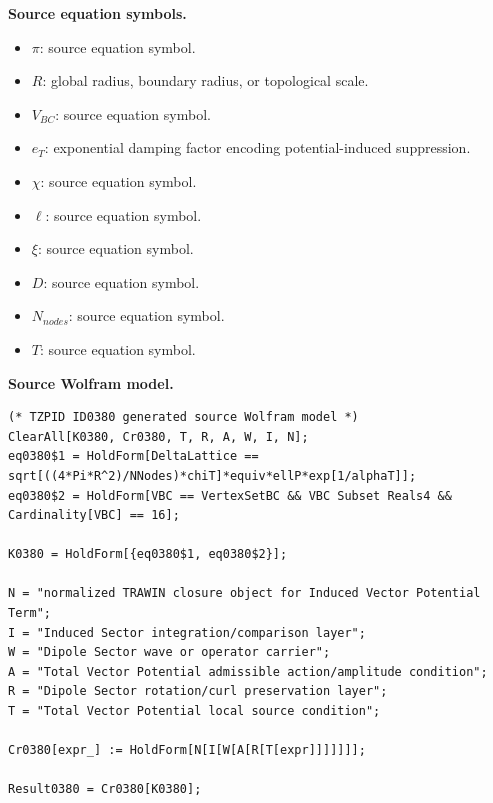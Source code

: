 \begin{minipage}[t]{0.49\linewidth}
\begingroup
\small
\raggedright
\textbf{Source equation symbols.}\par
\begin{itemize}[leftmargin=1.35em,itemsep=1pt,topsep=1pt,parsep=0pt]
    \item $\pi$: source equation symbol.
    \item $R$: global radius, boundary radius, or topological scale.
    \item $V_{BC}$: source equation symbol.
    \item $e_T$: exponential damping factor encoding potential-induced suppression.
    \item $\chi$: source equation symbol.
    \item $\ell$: source equation symbol.
    \item $\xi$: source equation symbol.
    \item $D$: source equation symbol.
    \item $N_{nodes}$: source equation symbol.
    \item $T$: source equation symbol.
\end{itemize}
\endgroup
\end{minipage}\hfill
\begin{minipage}[t]{0.47\linewidth}
\begingroup
\scriptsize
\raggedright
\textbf{Source Wolfram model.}\par
\begin{Verbatim}[fontsize=\tiny,breaklines=true,breakanywhere=true]
(* TZPID ID0380 generated source Wolfram model *)
ClearAll[K0380, Cr0380, T, R, A, W, I, N];
eq0380$1 = HoldForm[DeltaLattice == sqrt[((4*Pi*R^2)/NNodes)*chiT]*equiv*ellP*exp[1/alphaT]];
eq0380$2 = HoldForm[VBC == VertexSetBC && VBC Subset Reals4 && Cardinality[VBC] == 16];

K0380 = HoldForm[{eq0380$1, eq0380$2}];

N = "normalized TRAWIN closure object for Induced Vector Potential Term";
I = "Induced Sector integration/comparison layer";
W = "Dipole Sector wave or operator carrier";
A = "Total Vector Potential admissible action/amplitude condition";
R = "Dipole Sector rotation/curl preservation layer";
T = "Total Vector Potential local source condition";

Cr0380[expr_] := HoldForm[N[I[W[A[R[T[expr]]]]]]];

Result0380 = Cr0380[K0380];
\end{Verbatim}
\endgroup
\end{minipage}

